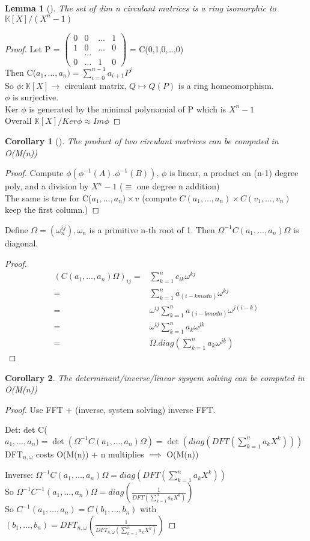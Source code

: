 \documentclass{article}
\newtheorem{lemma}{Lemma}
\newtheorem{corollary}{Corollary}
\theoremstyle{definition}
\theoremstyle{remark}
\newcommand{\Lem}[3]{\begin{lemma}[#1]\label{#2}#3\end{lemma}}
\newcommand{\Cor}[3]{\begin{corollary}[#1]\label{#2}#3\end{corollary}}
\newcommand{\K}{\mathbb{K}}
\begin{document}
\Lem{}{}{The set of dim n circulant matrices is a ring isomorphic to $\K[X]/(X^n - 1)$}
\begin{proof}
	Let P = $\begin{pmatrix}
	0&0&\dots&1\\
	1&0&\dots&0\\
	&\dots\\
	0&\dots&1&0
	\end{pmatrix}$ = C(0,1,0,\dots,0)\\
	Then C($a_1,\dots,a_n) = \sum_{i = 0}^{n-1} a_{i+1} P^i$\\
	So $\phi:\K[X] \rightarrow$ circulant matrix, $Q \mapsto Q(P)$ is a ring homeomorphism.\\
	$\phi$ is surjective.\\
	Ker $\phi$ is generated by the minimal polynomial of P which is $X^n -1 $\\
	Overall $\K[X]/Ker \phi \approx Im \phi$
\end{proof}
\Cor{}{}{The product of two circulant matrices can be computed in O(M(n))}
\begin{proof}
	Compute $\phi(\phi^{-1}(A).\phi^{-1}(B))$, $\phi$ is linear, a product on (n-1) degree poly, and a division by $X^n - 1$ ($\equiv$ one degree n addition)\\
	The same is true for C($a_1,\dots,a_n) \times v$ (compute $C(a_1,\dots,a_n)\times C(v_1,\dots,v_n)$ keep the first column.)
\end{proof}
Define $\Omega = (\omega_n^{ij}), \omega_n$ is a primitive n-th root of 1. Then $\Omega^{-1} C(a_1,\dots,a_n)\Omega$ is diagonal.
\begin{proof}
	\begin{align*}
	(C(a_1,\dots,a_n)\Omega)_{ij} = &\sum_{k = 1}^{n}c_{ik}\omega^{kj}\\
	= &\sum_{k = 1}^{n}a_{(i-k mod n)}\omega^{kj}\\
	= & \omega^{ij} \sum_{k=1}^n a_{(i-k mod n)}\omega^{j(i-k)}\\
	= & \omega^{ij} \sum_{k=1}^n a_{k}\omega^{jk}\\
	= & \Omega . diag(\sum_{k=1}^{n}a_k\omega^{jk})
	\end{align*}
\end{proof}
\begin{corollary}
	The determinant/inverse/linear sysyem solving can be computed in O(M(n))
\end{corollary}
\begin{proof}
	Use FFT + (inverse, system solving) inverse FFT.
	
Det: det C($a_1,\dots,a_n) = \det(\Omega^{-1} C(a_1,\dots,a_n) \Omega) = \det(diag(DFT(\sum_{k=1}^{n}a_kX^k)))$\\
DFT$_{n,\omega}$ costs O(M(n)) + n multiplies $\implies$ O(M(n))

Inverse: $\Omega^{-1} C(a_1,\dots,a_n) \Omega = diag(DFT(\sum_{k=1}^{n}a_kX^k))$\\
So $\Omega^{-1} C^{-1}(a_1,\dots,a_n) \Omega = diag(\frac{1}{DFT(\sum_{k=1}^{n}a_kX^k)})$\\
So $C^{-1}(a_1,\dots,a_n) = C(b_1,\dots,b_n)$ with $(b_1,\dots,b_n) = DFT_{n,\omega}(\frac{1}{DFT_{n,\omega}(\sum_{k=1}^{n}a_kX^k)})$
\end{proof}
\end{document}

